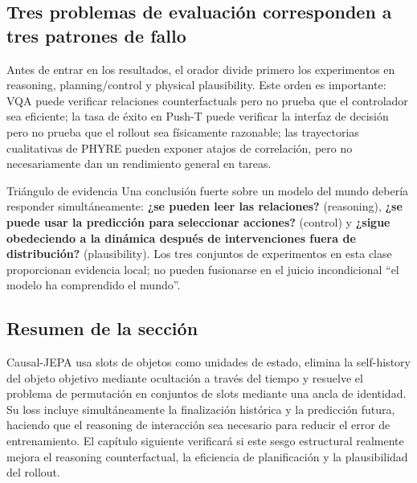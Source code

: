 \subsection{Tres problemas de evaluación corresponden a tres patrones de fallo}

Antes de entrar en los resultados, el orador divide primero los experimentos en reasoning, planning/control y physical plausibility. Este orden es importante: VQA puede verificar relaciones counterfactuals pero no prueba que el controlador sea eficiente; la tasa de éxito en Push-T puede verificar la interfaz de decisión pero no prueba que el rollout sea físicamente razonable; las trayectorias cualitativas de PHYRE pueden exponer atajos de correlación, pero no necesariamente dan un rendimiento general en tareas.


\begin{importantbox}{Triángulo de evidencia}
Una conclusión fuerte sobre un modelo del mundo debería responder simultáneamente: \textbf{¿se pueden leer las relaciones?} (reasoning), \textbf{¿se puede usar la predicción para seleccionar acciones?} (control) y \textbf{¿sigue obedeciendo a la dinámica después de intervenciones fuera de distribución?} (plausibility). Los tres conjuntos de experimentos en esta clase proporcionan evidencia local; no pueden fusionarse en el juicio incondicional ``el modelo ha comprendido el mundo''.
\end{importantbox}

\subsection{Resumen de la sección}

Causal-JEPA usa slots de objetos como unidades de estado, elimina la self-history del objeto objetivo mediante ocultación a través del tiempo y resuelve el problema de permutación en conjuntos de slots mediante una ancla de identidad. Su loss incluye simultáneamente la finalización histórica y la predicción futura, haciendo que el reasoning de interacción sea necesario para reducir el error de entrenamiento. El capítulo siguiente verificará si este sesgo estructural realmente mejora el reasoning counterfactual, la eficiencia de planificación y la plausibilidad del rollout.
